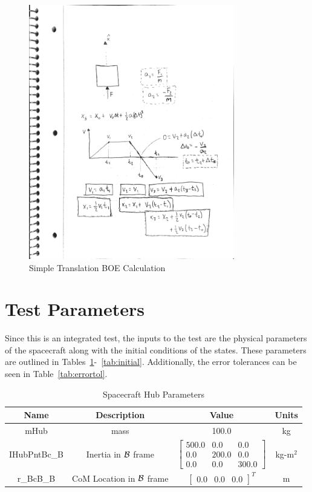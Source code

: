 \begin{figure}[htbp]
	\centerline{
		\includegraphics[width=0.8\textwidth]{Figures/TranslationBOE}}
	\caption{Simple Translation BOE Calculation}
	\label{fig:BOETrans}
\end{figure}

\clearpage

\section{Test Parameters}

Since this is an integrated test, the inputs to the test are the physical parameters of the spacecraft along with the initial conditions of the states. These parameters are outlined in Tables~\ref{tab:hub}-~\ref{tab:initial}. Additionally, the error tolerances can be seen in Table~\ref{tab:errortol}.

\begin{table}[htbp]
	\caption{Spacecraft Hub Parameters}
	\label{tab:hub}
	\centering \fontsize{10}{10}\selectfont
	\begin{tabular}{ c | c | c | c } %
		\hline
		\textbf{Name}  & \textbf{Description}  & \textbf{Value} & \textbf{Units} \\
		\hline
		mHub  & mass & 100.0 & kg \\
		IHubPntBc\_B & Inertia in $\cal{B}$ frame & $\begin{bmatrix}
		500.0 & 0.0 & 0.0\\
		0.0 & 200.0 & 0.0\\
		0.0 & 0.0 & 300.0
		\end{bmatrix}$ & kg-m$^2$ \\
		r\_BcB\_B & CoM Location in $\cal{B}$ frame & $\begin{bmatrix}
		0.0 & 0.0 & 0.0 \end{bmatrix}^T$ & m \\
		\hline
	\end{tabular}
\end{table}


